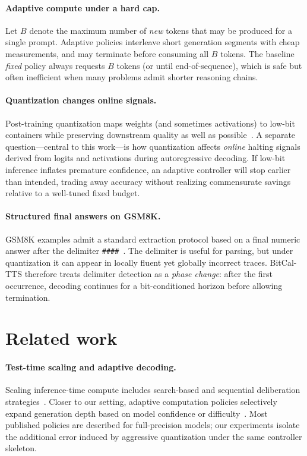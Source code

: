 \documentclass[11pt]{article}
\begin{document}
\paragraph{Adaptive compute under a hard cap.}
Let $B$ denote the maximum number of \emph{new} tokens that may be produced for a single prompt. Adaptive policies interleave short generation segments with cheap measurements, and may terminate before consuming all $B$ tokens. The baseline \emph{fixed} policy always requests $B$ tokens (or until end-of-sequence), which is safe but often inefficient when many problems admit shorter reasoning chains.

\paragraph{Quantization changes online signals.}
Post-training quantization maps weights (and sometimes activations) to low-bit containers while preserving downstream quality as well as possible~\cite{frantar2023gptq}. A separate question---central to this work---is how quantization affects \emph{online} halting signals derived from logits and activations during autoregressive decoding. If low-bit inference inflates premature confidence, an adaptive controller will stop earlier than intended, trading away accuracy without realizing commensurate savings relative to a well-tuned fixed budget.

\paragraph{Structured final answers on GSM8K.}
GSM8K examples admit a standard extraction protocol based on a final numeric answer after the delimiter \texttt{\#\#\#\#}~\cite{cobbe2021gsm8k}. The delimiter is useful for parsing, but under quantization it can appear in locally fluent yet globally incorrect traces. BitCal-TTS therefore treats delimiter detection as a \emph{phase change}: after the first occurrence, decoding continues for a bit-conditioned horizon before allowing termination.

\section{Related work}
\paragraph{Test-time scaling and adaptive decoding.}
Scaling inference-time compute includes search-based and sequential deliberation strategies~\cite{yao2023react,yao2024treeofthoughts,snell2024scalingllmtesttime}. Closer to our setting, adaptive computation policies selectively expand generation depth based on model confidence or difficulty~\cite{schuster2022confidentadaptive,geifman2017selectiveclassification}. Most published policies are described for full-precision models; our experiments isolate the additional error induced by aggressive quantization under the same controller skeleton.
\end{document}
